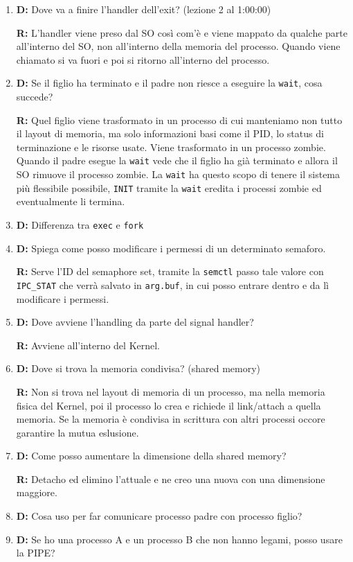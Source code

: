 \documentclass[a4paper, 12pt]{book}
\begin{document}
    \begin{enumerate}
        \item \textbf{D:} Dove va a finire l'handler dell'exit? (lezione 2 al 1:00:00)
        
        \textbf{R:} L'handler viene preso dal SO così com'è e viene 
        mappato da qualche parte all'interno del SO, non 
        all'interno della memoria del processo. Quando viene 
        chiamato si va fuori e poi si ritorno all'interno 
        del processo.
        \item \textbf{D:} Se il figlio ha terminato e il padre non riesce a 
        eseguire la \verb|wait|, cosa succede?

        \textbf{R:} Quel figlio viene trasformato in un processo di cui manteniamo 
        non tutto il layout di memoria, ma solo informazioni basi come il PID, lo status
        di terminazione e le risorse usate. Viene trasformato in un processo zombie. Quando il padre 
        esegue la \verb|wait| vede che il figlio ha già terminato e allora il SO 
        rimuove il processo zombie. La \verb|wait| ha questo scopo di tenere il sistema 
        più flessibile possibile, \verb|INIT| tramite la \verb|wait| eredita i processi 
        zombie ed eventualmente li termina.
        \item \textbf{D:} Differenza tra \verb|exec| e \verb|fork|
        \item \textbf{D:} Spiega come posso modificare i permessi 
        di un determinato semaforo. 

        \textbf{R:} Serve l'ID del semaphore set, tramite la \verb|semctl| 
        passo tale valore con \verb|IPC_STAT| che  verrà salvato 
        in \verb|arg.buf|, in cui posso entrare dentro e 
        da lì modificare i permessi.
        \item \textbf{D:} Dove avviene l'handling da parte del signal handler?
        
        \textbf{R:} Avviene all'interno del Kernel.
        \item \textbf{D:} Dove si trova la memoria condivisa? (shared memory)
        
        \textbf{R:} Non si trova nel layout di memoria di un processo, 
        ma nella memoria fisica del Kernel, poi il processo lo 
        crea e richiede il link/attach a quella memoria. Se la 
        memoria è condivisa in scrittura con altri processi 
        occore garantire la mutua eslusione.
        \item \textbf{D:} Come posso aumentare la dimensione della 
        shared memory?

        \textbf{R:} Detacho ed elimino l'attuale e ne creo una nuova 
        con una dimensione maggiore.
        \item \textbf{D:} Cosa uso per far comunicare processo 
        padre con processo figlio?
        \item \textbf{D:} Se ho una processo A e un 
        processo B che non hanno legami, posso usare la 
        PIPE?

        
    \end{enumerate}

    









     


    
    
\end{document}
